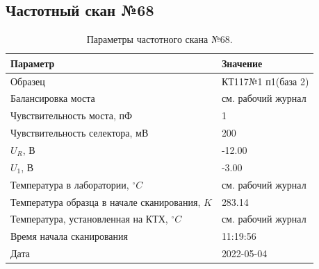 \subsection{Частотный скан №68}
\begin{table}[!ht]
    \centering
    \caption{Параметры частотного скана №68.}
    \begin{tabular}{|l|l|}
        \hline
        Параметр                                       & Значение                  \\ \hline
        Образец                                        & КТ117№1 п1(база 2)        \\ \hline
        Балансировка моста                             & см. рабочий журнал        \\ \hline
        Чувствительность моста, пФ                     & 1                         \\ \hline
        Чувствительность селектора, мВ                 & 200                       \\ \hline
        $U_R$, В                                       & -12.00                    \\ \hline
        $U_1$, В                                       & -3.00                     \\ \hline
        Температура в лаборатории, $^\circ C$          & см. рабочий журнал        \\ \hline
        Температура образца в начале сканирования, $K$ & 283.14                    \\ \hline
        Температура, установленная на КТХ, $^\circ C$  & см. рабочий журнал        \\ \hline
        Время начала сканирования                      & 11:19:56                  \\ \hline
        Дата                                           & 2022-05-04                \\ \hline
    \end{tabular}
    \label{table:frequency_scan_68}
\end{table}

